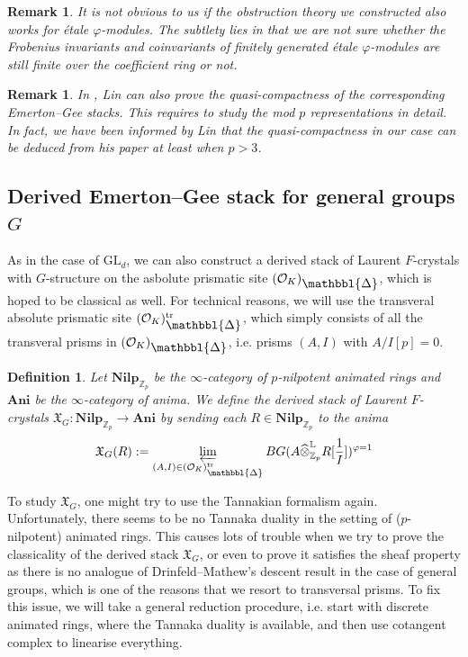 \documentclass[10pt]{article}
\newtheorem{rmk}[thm]{Remark}
\newtheorem{dfn}[thm]{Definition}
\numberwithin{equation}{section}
\newcommand{\frakX}{{\mathfrak X}}
\newcommand{\bL}{{\mathbb L}}
\newcommand{\bZ}{{\mathbb Z}}
\newcommand{\calO}{{\mathcal O}}
\newcommand{\GL}{{\mathrm{GL}}}             %
\newcommand{\Prism}{{\mathlarger{\mathbbl{\Delta}}}} %
\newcommand{\bfAni}{\textbf{Ani}}
\begin{document}
\begin{rmk}
    It is not obvious to us if the obstruction theory we constructed also works for \'etale $\varphi$-modules. The subtlety lies in that we are not sure whether the Frobenius invariants and coinvariants of finitely generated \'etale $\varphi$-modules are still finite over the coefficient ring or not.
\end{rmk}

\begin{rmk}\label{rmk-quasi-compactness}
    In \cite{Lin23}, Lin can also prove the quasi-compactness of the corresponding Emerton--Gee stacks. This requires to study the mod $p$ representations in detail. In fact, we have been informed by Lin that the quasi-compactness in our case can be deduced from his paper \cite{lin2023deligne} at least when $p>3$.
\end{rmk}

\subsection{Derived Emerton--Gee stack for general groups $G$}
As in the case of $\GL_d$, we can also construct a derived stack of Laurent $F$-crystals with $G$-structure on the asbolute prismatic site $(\calO_K)_{\Prism}$, which is hoped to be classical as well. For technical reasons, we will use the transveral absolute prismatic site $(\calO_K)_{\Prism}^{\rm tr}$, which simply consists of all the transveral prisms in $(\calO_K)_{\Prism}$, i.e. prisms $(A,I)$ with $A/I[p]=0$.

\begin{dfn}
Let $\textbf{Nilp}_{\bZ_p}$ be the $\infty$-category of $p$-nilpotent animated rings and $\bfAni$ be the $\infty$-category of anima. We define the derived stack of Laurent $F$-crystals $\frakX_G:\textbf{Nilp}_{\bZ_p}\to \bfAni$ by sending each $R\in\textbf{Nilp}_{\bZ_p}$ to the anima 
\[
\frakX_G(R):=\varprojlim_{(A,I)\in (\calO_K)_{\Prism}^{\rm tr}}BG(A\widehat\otimes_{\bZ_p}^{\bL}R[\frac{1}{I}])^{\varphi=1}
\]
\end{dfn}

To study $\frakX_G$, one might try to use the Tannakian formalism again. Unfortunately, there seems to be no Tannaka duality in the setting of ($p$-nilpotent) animated rings. This causes lots of trouble when we try to prove the classicality of the derived stack $\frakX_G$, or even to prove it satisfies the sheaf property as there is no analogue of Drinfeld--Mathew's descent result in the case of general groups, which is one of the reasons that we resort to transversal prisms. To fix this issue, we will take a general reduction procedure, i.e. start with discrete animated rings, where the Tannaka duality is available, and then use cotangent complex to linearise everything.
\end{document}
